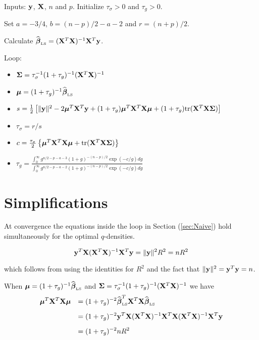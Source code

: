 \documentclass{article}
\def\vectorfontone{\bf}
\def\vectorfonttwo{\boldsymbol}
\def\vy{{\vectorfontone y}}                      %
\def\vbeta{{\vectorfonttwo \beta}}               %
\def\vmu{{\vectorfonttwo \mu}}                   %
\def\matrixfontone{\bf}
\def\matrixfonttwo{\boldsymbol}
\def\mX{{\matrixfontone X}}                      %
\def\mSigma{{\matrixfonttwo \Sigma}}             %
\def\ds{\displaystyle}
\begin{document}
Inputs: $\vy$, $\mX$, $n$ and $p$. Initialize $\tau_\sigma>0$ and $\tau_g>0$.

\medskip 
\noindent 
Set $a = -3/4$, $b = (n-p)/2 - a - 2$ and $r = (n+p)/2$.

\medskip 
\noindent 
Calculate $\widehat{\vbeta}_{\mbox{\tiny LS}} = (\mX^T\mX)^{-1}\mX^T\vy$.

\medskip 
\noindent Loop:
\begin{itemize}
	\item $\mSigma = \tau_\sigma^{-1}(1 + \tau_g)^{-1}(\mX^T\mX)^{-1}$
	
	\item $\vmu = (1 + \tau_g)^{-1}\widehat{\vbeta}_{\mbox{\tiny LS}}$
	
	\item $s  = \tfrac{1}{2}\left[ \|\vy\|^2 
	- 2\vmu^T\mX^T\vy 
	+ (1 + \tau_g)\vmu^T\mX^T\mX\vmu  
	+ (1 + \tau_g)\mbox{tr}(\mX^T\mX\mSigma)
	\right]$
	
	\item $\tau_\sigma = r/s$
	
	\item $c 
	= \tfrac{\tau_\sigma}{2}\left\{ \vmu^T\mX^T\mX\vmu + \mbox{tr}(\mX^T\mX\mSigma)\right\}$
	
	\item $\ds \tau_g = \frac{\ds \int_0^\infty g^{n/2 - p - a - 3}(1 + g)^{-(n-p)/2}
		\exp( 
		- c/g) dg
	}{\ds \int_0^\infty g^{n/2 - p - a - 2}(1 + g)^{-(n-p)/2}
	\exp( 
	- c/g) dg}$
\end{itemize}



\newpage 

\section{Simplifications}

\noindent At convergence
the equations inside the loop in Section 
(\ref{sec:Naive}) hold simultaneously 
for the optimal $q$-densities.

\medskip 
{} 
$$
\vy^T\mX(\mX^T\mX)^{-1}\mX^T\vy = \|\vy\|^2 R^2 = nR^2
$$

\noindent 
which follows from using the identities for $R^2$ and the fact that $\|\vy\|^2 = \vy^T\vy = n$.  


\medskip 
{} 
When $\vmu = (1 + \tau_g)^{-1}\widehat{\vbeta}_{\mbox{\tiny LS}}$
and $\mSigma = \tau_\sigma^{-1}(1 + \tau_g)^{-1}(\mX^T\mX)^{-1}$ we have
$$
\begin{array}{rl}
\ds \vmu^T\mX^T\mX\vmu  
& \ds = (1 + \tau_g)^{-2}\widehat{\vbeta}_{\mbox{\tiny LS}}^T\mX^T\mX \widehat{\vbeta}_{\mbox{\tiny LS}} \\ [2ex]  
& \ds = (1 + \tau_g)^{-2}\vy^T\mX(\mX^T\mX)^{-1}\mX^T\mX (\mX^T\mX)^{-1}\mX^T\vy \\ [2ex]  
& \ds = (1 + \tau_g)^{-2} n R^2
\end{array}
$$
\end{document}
